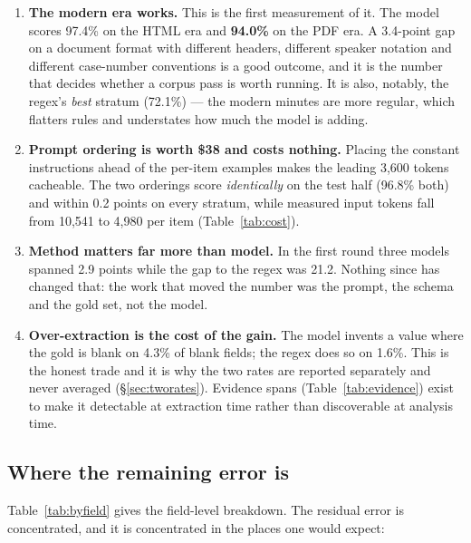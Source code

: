 \documentclass[11pt]{article}
\begin{document}
\begin{enumerate}
\item \textbf{The modern era works.} This is the first measurement of it. The model scores
97.4\% on the HTML era and \textbf{94.0\%} on the PDF era. A 3.4-point gap on a document
format with different headers, different speaker notation and different case-number
conventions is a good outcome, and it is the number that decides whether a corpus pass is
worth running. It is also, notably, the regex's \emph{best} stratum (72.1\%) --- the modern
minutes are more regular, which flatters rules and understates how much the model is adding.

\item \textbf{Prompt ordering is worth \$38 and costs nothing.} Placing the constant
instructions ahead of the per-item examples makes the leading 3{,}600 tokens cacheable. The
two orderings score \emph{identically} on the test half (96.8\% both) and within 0.2 points on
every stratum, while measured input tokens fall from 10{,}541 to 4{,}980 per item
(Table~\ref{tab:cost}).

\item \textbf{Method matters far more than model.} In the first round three models spanned 2.9
points while the gap to the regex was 21.2. Nothing since has changed that: the work that
moved the number was the prompt, the schema and the gold set, not the model.

\item \textbf{Over-extraction is the cost of the gain.} The model invents a value where the
gold is blank on 4.3\% of blank fields; the regex does so on 1.6\%. This is the honest
trade and it is why the two rates are reported separately and never averaged
(\S\ref{sec:tworates}). Evidence spans (Table~\ref{tab:evidence}) exist to make it
detectable at extraction time rather than discoverable at analysis time.
\end{enumerate}

\subsection{Where the remaining error is}

Table~\ref{tab:byfield} gives the field-level breakdown. The residual error is concentrated,
and it is concentrated in the places one would expect:
\end{document}
